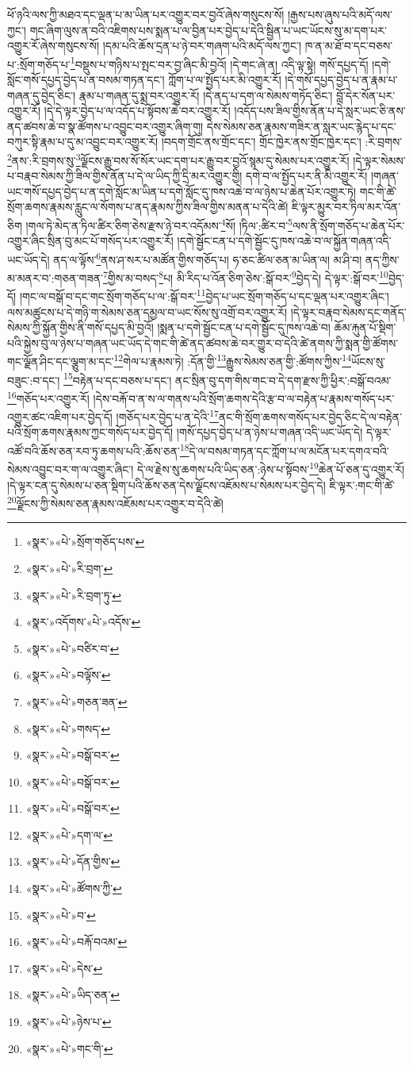 ཕོ་ཉའི་ལས་ཀྱི་མཐའ་དང་ལྡན་པ་མ་ཡིན་པར་འགྱུར་བར་བྱའོ་ཞེས་གསུངས་སོ། །རྒྱས་པས་ཞུས་པའི་མདོ་ལས་ཀྱང་། གང་ཞིག་ལུས་ན་བའི་འཇིགས་པས་སྨན་པ་ལ་བྱིན་པར་བྱེད་པ་དེའི་སྦྱིན་པ་ཡང་ཡོངས་སུ་མ་དག་པར་འགྱུར་རོ་ཞེས་གསུངས་སོ། །དམ་པའི་ཆོས་དྲན་པ་ཉེ་བར་གཞག་པའི་མདོ་ལས་ཀྱང་། ཁ་ན་མ་ཐོ་བ་དང་བཅས་པ་:སྲོག་གཅོད་པ་\footnote{«སྣར་»«པེ་»སྲོག་གཅོད་པས་}བསྡུས་པ་གཉིས་པ་སྤང་བར་བྱ་ཞིང་མི་བྱའོ། །དེ་གང་ཞེ་ན། འདི་ལྟ་སྟེ། གསོ་དཔྱད་དོ། །དགེ་སློང་གསོ་དཔྱད་བྱེད་པ་ན་བསམ་གཏན་དང་། ཀློག་པ་ལ་སྤྱོད་པར་མི་འགྱུར་རོ། །དེ་གསོ་དཔྱད་བྱེད་པ་ན་རྣམ་པ་གཞན་དུ་བྱེད་ཅིང་། རྣམ་པ་གཞན་དུ་སྨྲ་བར་འགྱུར་རོ། །དེ་ནད་པ་དག་ལ་སེམས་གཏོད་ཅིང་། བློ་དེར་སོན་པར་འགྱུར་རོ། །དེ་དེ་ལྟར་བྱེད་པ་ལ་འདོད་པ་སྟོབས་ཆེ་བར་འགྱུར་རོ། །འདོད་པས་ཟིལ་གྱིས་ནོན་པ་དེ་སླར་ཡང་ཅི་ནས་ནད་ཚབས་ཆེ་བ་སྣ་ཚོགས་པ་འབྱུང་བར་འགྱུར་ཞིག་གུ། དེས་སེམས་ཅན་རྣམས་གཟིར་ན་སླར་ཡང་རྙེད་པ་དང་བཀུར་སྟི་རྣམ་པ་དུ་མ་འབྱུང་བར་འགྱུར་རོ། །བདག་གྲོང་ནས་གྲོང་དང་། གྲོང་ཁྱེར་ནས་གྲོང་ཁྱེར་དང་། :རི་བྲགས་\footnote{«སྣར་»«པེ་»རི་བྲག་}ནས་:རི་བྲགས་སུ་\footnote{«སྣར་»«པེ་»རི་བྲག་ཏུ་}ལྗོངས་རྒྱུ་བས་སོ་སོར་ཡང་དག་པར་རྒྱུ་བར་བྱའོ་སྙམ་དུ་སེམས་པར་འགྱུར་རོ། །དེ་ལྟར་སེམས་པ་བརྣབ་སེམས་ཀྱི་ཟིལ་གྱིས་ནོན་པ་དེ་ལ་ཡིད་ཀྱི་དྲི་མར་འགྱུར་གྱི། དགེ་བ་ལ་སྤྱོད་པར་ནི་མི་འགྱུར་རོ། །གཞན་ཡང་གསོ་དཔྱད་བྱེད་པ་ན་དགེ་སློང་མ་ཡིན་པ་དགེ་སློང་དུ་ཁས་འཆེ་བ་ལ་ཉེས་པ་ཆེན་པོར་འགྱུར་ཏེ། གང་གི་ཚེ་སྲོག་ཆགས་རྣམས་རླུང་ལ་སོགས་པ་ནད་རྣམས་ཀྱིས་ཟིལ་གྱིས་མནན་པ་དེའི་ཚེ། ཇི་ལྟར་མྱུར་བར་ཏིལ་མར་འོན་ཅིག །གལ་ཏེ་མེད་ན་ཏིལ་ཚིར་ཅིག་ཅེས་རྫས་ཉེ་བར་འདོམས་\footnote{«སྣར་»འདོགས་«པེ་»འདོས་}སོ། །ཏིལ་:ཚིར་བ་\footnote{«སྣར་»«པེ་»བཙིར་བ་}ལས་ནི་སྲོག་གཅོད་པ་ཆེན་པོར་འགྱུར་ཞིང་སྲིན་བུ་མང་པོ་གསོད་པར་འགྱུར་རོ། །དགེ་སྦྱོང་ངན་པ་དགེ་སྦྱོང་དུ་ཁས་འཆེ་བ་ལ་སྐྱོན་གཞན་འདི་ཡང་ཡོད་དེ། ནད་ལ་ལྟོས་\footnote{«སྣར་»«པེ་»བལྟོས་}ནས་ཤ་སར་པ་མཚོན་གྱིས་གཅོད་པ། ཧ་ཅང་ཚིལ་ཅན་མ་ཡིན་ལ། མ་ཤི་བ། ནད་ཀྱིས་མ་མནར་བ་:གཅན་གཟན་\footnote{«སྣར་»«པེ་»གཅན་ཟན་}གྱིས་མ་བསད་\footnote{«སྣར་»«པེ་»གསད་}པ། མི་རིད་པ་འོན་ཅིག་ཅེས་:སྒོ་བར་\footnote{«སྣར་»«པེ་»བསྒོ་བར་}བྱེད་དེ། དེ་ལྟར་:སྒོ་བར་\footnote{«སྣར་»«པེ་»བསྒོ་བར་}བྱེད་དོ། །གང་ལ་བསྒོ་བ་དང་གང་སྲོག་གཅོད་པ་ལ་:སྒོ་བར་\footnote{«སྣར་»«པེ་»བསྒོ་བར་}བྱེད་པ་ཡང་སྲོག་གཅོད་པ་དང་ལྡན་པར་འགྱུར་ཞིང་། ལས་མཚུངས་པ་དེ་གཉི་ག་སེམས་ཅན་དམྱལ་བ་ཡང་སོས་སུ་འགྲོ་བར་འགྱུར་རོ། །དེ་ལྟར་བརྣབ་སེམས་དང་གནོད་སེམས་ཀྱི་སྐྱོན་གྱིས་ནི་གསོ་དཔྱད་མི་བྱའོ། །སྨན་པ་དགེ་སྦྱོང་ངན་པ་དགེ་སྦྱོང་དུ་ཁས་འཆེ་བ། ཆོམ་རྐུན་པོ་སྡིག་པའི་སྐྱེས་བུ་ལ་ཉེས་པ་གཞན་ཡང་ཡོད་དེ་གང་གི་ཚེ་ནད་ཚབས་ཆེ་བར་གྱུར་བ་དེའི་ཚེ་ནགས་ཀྱི་སྨན་གྱི་ཚོགས་གང་ལྗོན་ཤིང་དང་ལྕུག་མ་དང་\footnote{«སྣར་»«པེ་»དག་ལ་}གེལ་པ་རྣམས་ཏེ། :དོན་གྱི་\footnote{«སྣར་»«པེ་»དོན་གྱིས་}རྒྱུས་སེམས་ཅན་གྱི་:ཚོགས་ཀྱིས་\footnote{«སྣར་»«པེ་»ཚོགས་ཀྱི་}ཡོངས་སུ་བཟུང་:བ་དང་། \footnote{«སྣར་»«པེ་»བ་}བརྟེན་པ་དང་བཅས་པ་དང་། ནང་སྲིན་བུ་དག་གིས་གང་བ་དེ་དག་རྫས་ཀྱི་ཕྱིར་:བསྒོ་བའམ་\footnote{«སྣར་»«པེ་»བརྐོ་བའམ་}གཅོད་པར་འགྱུར་རོ། །དེས་བརྐོ་བ་ན་ས་ལ་གནས་པའི་སྲོག་ཆགས་དེའི་རྩ་བ་ལ་བརྟེན་པ་རྣམས་གསོད་པར་འགྱུར་ཚང་འཇིག་པར་བྱེད་དོ། །གཅོད་པར་བྱེད་པ་ན་དེའི་\footnote{«སྣར་»«པེ་»དེས་}ནང་གི་སྲོག་ཆགས་གསོད་པར་བྱེད་ཅིང་དེ་ལ་བརྟེན་པའི་སྲོག་ཆགས་རྣམས་ཀྱང་གསོད་པར་བྱེད་དོ། །གསོ་དཔྱད་བྱེད་པ་ན་ཉེས་པ་གཞན་འདི་ཡང་ཡོད་དེ། དེ་ལྟར་འཚོ་བའི་ཆོས་ཅན་རབ་ཏུ་ཆགས་པའི་:ཆོས་ཅན་\footnote{«སྣར་»«པེ་»ཡིད་ཅན་}དེ་ལ་བསམ་གཏན་དང་ཀློག་པ་ལ་མངོན་པར་དགའ་བའི་སེམས་འབྱུང་བར་ག་ལ་འགྱུར་ཞིང་། དེ་ལ་རྗེས་སུ་ཆགས་པའི་ཡིད་ཅན་:ཉེས་པ་སྟོབས་\footnote{«སྣར་»«པེ་»ཉེས་པ་}ཆེན་པོ་ཅན་དུ་འགྱུར་རོ། །དེ་ལྟར་ངན་དུ་སེམས་པ་ཅན་སྡིག་པའི་ཆོས་ཅན་དེས་ལྗོངས་འཇོམས་པ་སེམས་པར་བྱེད་དེ། ཇི་ལྟར་:གང་གི་ཚེ་\footnote{«སྣར་»«པེ་»གང་གི་}ལྗོངས་ཀྱི་སེམས་ཅན་རྣམས་འཇོམས་པར་འགྱུར་བ་དེའི་ཚེ། 